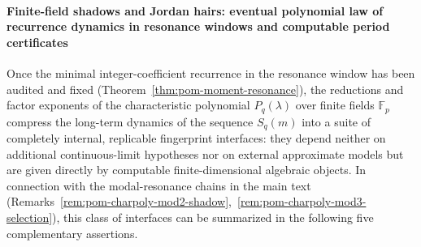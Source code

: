 \paragraph{Finite-field shadows and Jordan hairs: eventual polynomial law of recurrence dynamics in resonance windows and computable period certificates}
Once the minimal integer-coefficient recurrence in the resonance window has been audited and fixed (Theorem~\ref{thm:pom-moment-resonance}), the reductions and factor exponents of the characteristic polynomial \(P_q(\lambda)\) over finite fields \(\mathbb{F}_p\) compress the long-term dynamics of the sequence \(S_q(m)\) into a suite of completely internal, replicable fingerprint interfaces: they depend neither on additional continuous-limit hypotheses nor on external approximate models but are given directly by computable finite-dimensional algebraic objects. In connection with the modal-resonance chains in the main text (Remarks~\ref{rem:pom-charpoly-mod2-shadow},~\ref{rem:pom-charpoly-mod3-selection}), this class of interfaces can be summarized in the following five complementary assertions.
